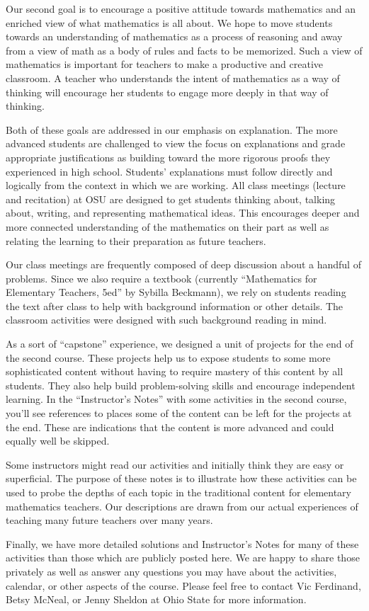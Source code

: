 \documentclass{ximera}
\begin{document}
Our second goal is to encourage a positive attitude towards mathematics and an enriched view 
of what mathematics is all about.  We hope to move students towards an understanding of mathematics
as a process of reasoning and away from a view of math as a body of 
rules and facts to be memorized. Such a view of mathematics is important for teachers to make a productive and 
creative classroom. A teacher who understands the intent of mathematics as a way of 
thinking will encourage her students to engage more deeply in that way of thinking.  

Both of these goals are addressed in our emphasis on explanation.  The more 
advanced students are challenged to view the focus on explanations and grade appropriate justifications as building toward the more rigorous proofs they experienced in high school.  
Students' explanations must follow directly and logically from the context in which we are working.  
All class meetings (lecture and recitation) at OSU are designed to get students thinking about, talking 
about, writing, and representing mathematical ideas.  This encourages deeper and more connected 
understanding of the mathematics on their part as well as relating the learning to their preparation as future teachers.  

Our class meetings are frequently composed of deep discussion about a handful of problems.  Since we also require 
a textbook (currently ``Mathematics for Elementary Teachers, 5ed'' by Sybilla Beckmann), we rely on 
students reading the text after class to help with background information or other details.  The 
classroom activities were designed with such background reading in mind.

As a sort of ``capstone'' experience, we designed a unit of projects for the end of the second 
course.  These projects help us to expose students to some more sophisticated content without 
having to require mastery of this content by all students.  They also help build problem-solving skills and 
encourage independent learning.  In the ``Instructor's Notes'' with some activities in the second 
course, you'll see references to places some of the content can be left for the projects at the end. 
These are indications that the content is more advanced and could equally well be skipped.

Some instructors might read our activities and initially think they are easy or superficial.  The purpose of these notes is to illustrate how these activities can be used to probe the depths of each topic in the traditional content for elementary mathematics teachers.  Our descriptions are drawn from our actual experiences of teaching many future teachers over many years.

Finally, we have more detailed solutions and Instructor's Notes for many of these activities than those 
which are publicly posted here.  We are happy to share those privately as well as answer any 
questions you may have about the activities, calendar, or other aspects of the course.  Please feel 
free to contact Vic Ferdinand, Betsy McNeal, or Jenny Sheldon at Ohio State for more information.
\end{document}
